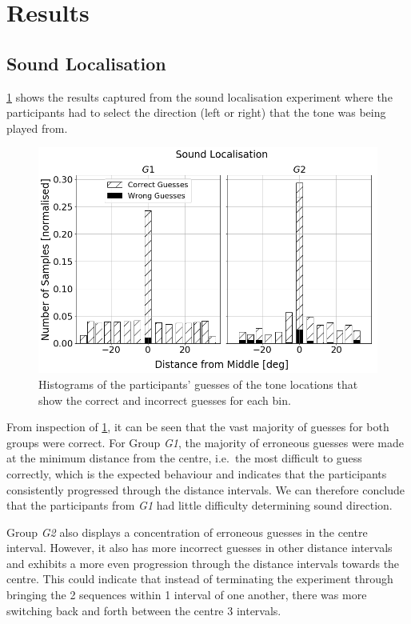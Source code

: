 \documentclass{article}
\begin{document}
\section{Results}\label{sec:results}

\subsection{Sound Localisation}

\cref{fig:sound-localisation} shows the results captured from the sound localisation experiment where the participants had to select the direction (left or right) that the tone was being played from. 

\begin{figure}
  \centering
  \includegraphics[width=1.0\textwidth]{figures/sound_localisation.png}
  \caption{Histograms of the participants' guesses of the tone locations that show the correct and incorrect guesses for each bin. }\label{fig:sound-localisation}
\end{figure}

From inspection of \cref{fig:sound-localisation}, it can be seen that the vast majority of guesses for both groups were correct.
For Group \textit{G1}, the majority of erroneous guesses were made at the minimum distance from the centre, i.e.\ the most difficult to guess correctly, which is the expected behaviour and indicates that the participants consistently progressed through the distance intervals.
We can therefore conclude that the participants from \textit{G1} had little difficulty determining sound direction.

Group \textit{G2} also displays a concentration of erroneous guesses in the centre interval.
However, it also has more incorrect guesses in other distance intervals and exhibits a more even progression through the distance intervals towards the centre.
This could indicate that instead of terminating the experiment through bringing the 2 sequences within 1 interval of one another, there was more switching back and forth between the centre 3 intervals. 
\end{document}
